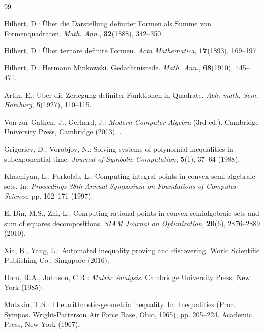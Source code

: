 \documentclass[runningheads]{llncs}
\begin{document}
{\newpage 

%
%
%
% 
% 
%
\begin{thebibliography}{99}
	
	Hilbert, D.: \"{U}ber die Darstellung definiter Formen als Summe von Formenquadraten. \textit{ Math. Ann.}, \textbf{32}(1888), 342--350.
	
	Hilbert, D.: \"{U}ber tern\"{a}re definite Formen. \textit{ Acta Mathematica}, \textbf{17}(1893), 169--197.
	
	Hilbert, D.: Hermann Minkowski. Ged\"{a}chtnisrede. \textit{ Math. Ann.}, \textbf{68}(1910), 445--471.
	
	Artin, E.: \"{U}ber die Zerlegung definiter Funktionen in Quadrate. \textit{ Abh. math. Sem. Hamburg}, \textbf{5}(1927), 110--115.
	
	Von zur Gathen, J., Gerhard, J.: \textit{ Modern Computer Algebra} (3rd ed.). Cambridge University Press, Cambridge (2013). .
	
	Grigoriev, D., Vorobjov, N.: Solving systems of polynomial inequalities in subexponential time. \textit{ Journal of Symbolic Computation}, \textbf{5}(1), 37--64 (1988).
	
	Khachiyan, L., Porkolab, L.: Computing integral points in convex semi-algebraic sets. In: \textit{ Proceedings 38th Annual Symposium on Foundations of Computer Science}, pp. 162--171 (1997).
	
	El Din, M.S., Zhi, L.: Computing rational points in convex semialgebraic sets and sum of squares decompositions. \textit{ SIAM Journal on Optimization}, \textbf{20}(6), 2876--2889 (2010).
	
	Xia, B., Yang, L.: Automated inequality proving and discovering. World Scientific Publishing Co., Singapore (2016). 
	
	Horn, R.A., Johnson, C.R.: \textit{ Matrix Analysis}. Cambridge University Press, New York (1985).
	
	Motzkin, T.S.: The arithmetic-geometric inequality. In: Inequalities (Proc. Sympos. Wright-Patterson Air Force Base, Ohio, 1965), pp. 205--224. Academic Press, New York (1967).
	

\end{thebibliography}}
\end{document}
